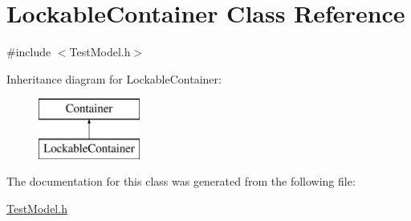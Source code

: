 \hypertarget{classLockableContainer}{}\section{Lockable\+Container Class Reference}
\label{classLockableContainer}


{\ttfamily \#include $<$Test\+Model.\+h$>$}

Inheritance diagram for Lockable\+Container\+:\begin{figure}[H]
\begin{center}
\leavevmode
\includegraphics[height=2.000000cm]{classLockableContainer}
\end{center}
\end{figure}


The documentation for this class was generated from the following file\+:\begin{DoxyCompactItemize}
\item 
\hyperlink{TestModel_8h}{Test\+Model.\+h}\end{DoxyCompactItemize}
